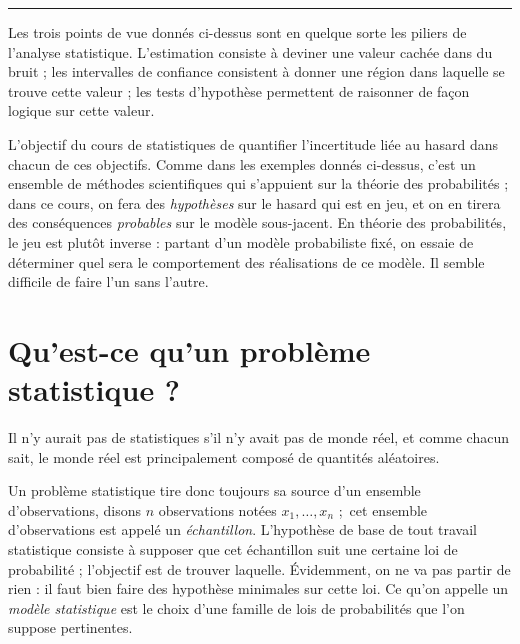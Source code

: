 \documentclass[
  10,
  letterpaper,
  DIV=11,
  numbers=noendperiod]{scrreport}
\theoremstyle{plain}
\theoremstyle{definition}
\theoremstyle{plain}
\theoremstyle{definition}
\theoremstyle{definition}
\theoremstyle{plain}
\theoremstyle{remark}
\begin{document}
\begin{center}\rule{0.5\linewidth}{0.5pt}\end{center}

Les trois points de vue donnés ci-dessus sont en quelque sorte les
piliers de l'analyse statistique. L'estimation consiste à deviner une
valeur cachée dans du bruit ; les intervalles de confiance consistent à
donner une région dans laquelle se trouve cette valeur ; les tests
d'hypothèse permettent de raisonner de façon logique sur cette valeur.

L'objectif du cours de statistiques de quantifier l'incertitude liée au
hasard dans chacun de ces objectifs. Comme dans les exemples donnés
ci-dessus, c'est un ensemble de méthodes scientifiques qui s'appuient
sur la théorie des probabilités ; dans ce cours, on fera des
\emph{hypothèses} sur le hasard qui est en jeu, et on en tirera des
conséquences \emph{probables} sur le modèle sous-jacent. En théorie des
probabilités, le jeu est plutôt inverse : partant d'un modèle
probabiliste fixé, on essaie de déterminer quel sera le comportement des
réalisations de ce modèle. Il semble difficile de faire l'un sans
l'autre.

\hypertarget{quest-ce-quun-probluxe8me-statistique}{%
\section{Qu'est-ce qu'un problème statistique
?}\label{quest-ce-quun-probluxe8me-statistique}}

Il n'y aurait pas de statistiques s'il n'y avait pas de monde réel, et
comme chacun sait, le monde réel est principalement composé de quantités
aléatoires.

Un problème statistique tire donc toujours sa source d'un ensemble
d'observations, disons \(n\) observations notées \(x_1, \dotsc, x_n\)
;~cet ensemble d'observations est appelé un \emph{échantillon}.
L'hypothèse de base de tout travail statistique consiste à supposer que
cet échantillon suit une certaine loi de probabilité ; l'objectif est de
trouver laquelle. Évidemment, on ne va pas partir de rien : il faut bien
faire des hypothèse minimales sur cette loi. Ce qu'on appelle un
\emph{modèle statistique} est le choix d'une famille de lois de
probabilités que l'on suppose pertinentes.
\end{document}
